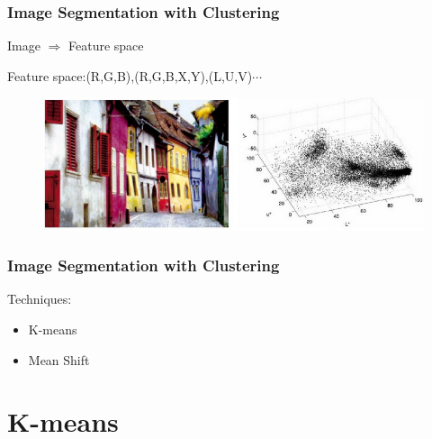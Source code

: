 \documentclass[notheorems,serif,table,compress]{beamer}  %
\begin{document}
 \begin{frame}
\frametitle{Image Segmentation with Clustering}
   \centering \qquad \quad Image \quad $\Longrightarrow$ \quad Feature space\newline

{\color{blue}Feature space:}(R,G,B),(R,G,B,X,Y),(L,U,V)$\cdots$
    \begin{figure}
      \includegraphics[width=0.8\linewidth]{clustering.png}
    \end{figure}
\end{frame}
 
\begin{frame}
\frametitle{Image Segmentation with Clustering}
{\color{blue}Techniques}:
    \begin{itemize}
      \item K-means
      \item Mean Shift
    \end{itemize}
\end{frame}


\section{K-means}

\end{document}
